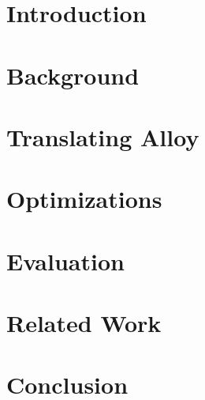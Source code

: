 




\chapter{Introduction}


\chapter{Background}


\chapter{Translating Alloy}


\chapter{Optimizations}


\chapter{Evaluation}


\chapter{Related Work}


\chapter{Conclusion}


